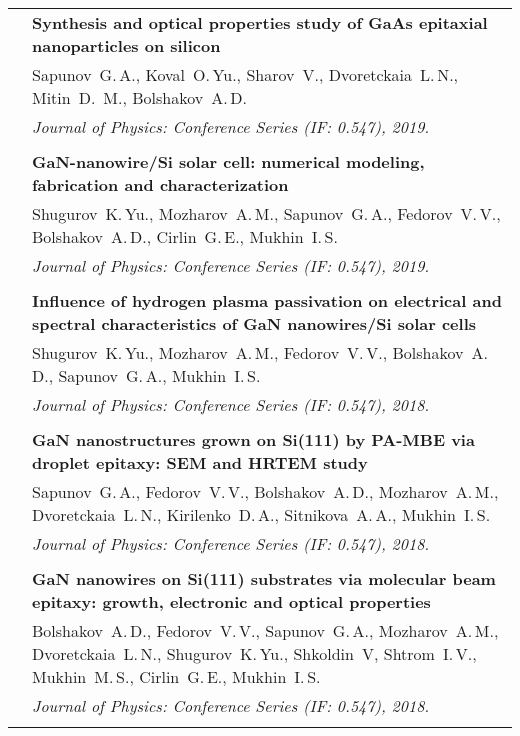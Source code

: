 \documentclass[letterpaper, 11pt]{article}
\begin{document}
\begin{longtable}{p{1.3in}p{4.8in}}
        & \textbf{Synthesis and optical properties study of GaAs epitaxial
        nanoparticles on silicon} \\
        & Sapunov~G.\,A., Koval~O.\,Yu., Sharov~V., Dvoretckaia~L.\,N.,
        Mitin~D.\, M., Bolshakov~A.\,D. \\
		& \textit{Journal of Physics: Conference Series (IF: 0.547), 2019.}\\
		& \\
		
        & \textbf{GaN-nanowire/Si solar cell: numerical modeling, fabrication
        and characterization} \\
        & Shugurov~K.\,Yu., Mozharov~A.\,M., Sapunov~G.\,A., Fedorov~V.\,V.,
        Bolshakov~A.\,D., Cirlin~G.\,E., Mukhin~I.\,S. \\
		& \textit{Journal of Physics: Conference Series (IF: 0.547), 2019.}\\
		& \\
		
        & \textbf{Influence of hydrogen plasma passivation on electrical and
        spectral characteristics of GaN nanowires/Si solar cells} \\
        & Shugurov~K.\,Yu., Mozharov~A.\,M., Fedorov~V.\,V., Bolshakov~A.\,D.,
        Sapunov~G.\,A., Mukhin~I.\,S. \\
		& \textit{Journal of Physics: Conference Series (IF: 0.547), 2018.}\\
		& \\
		
        & \textbf{GaN nanostructures grown on Si(111) by PA-MBE via droplet
        epitaxy: SEM and HRTEM study} \\
        & Sapunov~G.\,A., Fedorov~V.\,V., Bolshakov~A.\,D., Mozharov~A.\,M.,
        Dvoretckaia~L.\,N., Kirilenko~D.\,A., Sitnikova~A.\,A., Mukhin~I.\,S.
        \\
		& \textit{Journal of Physics: Conference Series (IF: 0.547), 2018.}\\
		& \\
		
        & \textbf{GaN nanowires on Si(111) substrates via molecular beam
        epitaxy: growth, electronic and optical properties} \\
        & Bolshakov~A.\,D., Fedorov~V.\,V., Sapunov~G.\,A., Mozharov~A.\,M.,
        Dvoretckaia~L.\,N., Shugurov~K.\,Yu., Shkoldin~V, Shtrom~I.\,V.,
        Mukhin~M.\,S., Cirlin~G.\,E., Mukhin~I.\,S. \\
		& \textit{Journal of Physics: Conference Series (IF: 0.547), 2018.}\\
		& \\
		

\end{longtable}
\end{document}
